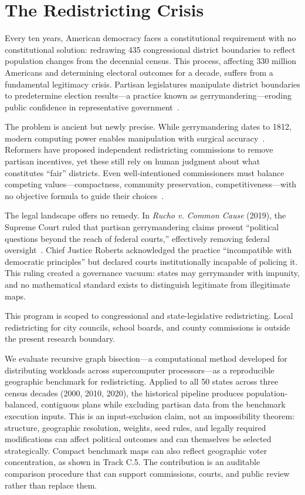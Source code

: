 \section{The Redistricting Crisis}

Every ten years, American democracy faces a constitutional requirement with no constitutional solution: redrawing 435 congressional district boundaries to reflect population changes from the decennial census. This process, affecting 330 million Americans and determining electoral outcomes for a decade, suffers from a fundamental legitimacy crisis. Partisan legislatures manipulate district boundaries to predetermine election results---a practice known as gerrymandering---eroding public confidence in representative government~\cite{stephanopoulos2015partisan}.

The problem is ancient but newly precise. While gerrymandering dates to 1812, modern computing power enables manipulation with surgical accuracy~\cite{cho2016measuring}. Reformers have proposed independent redistricting commissions to remove partisan incentives, yet these still rely on human judgment about what constitutes ``fair'' districts. Even well-intentioned commissioners must balance competing values---compactness, community preservation, competitiveness---with no objective formula to guide their choices~\cite{duchin2018geometry}.

The legal landscape offers no remedy. In \emph{Rucho v. Common Cause} (2019), the Supreme Court ruled that partisan gerrymandering claims present ``political questions beyond the reach of federal courts,'' effectively removing federal oversight~\cite{rucho2019}. Chief Justice Roberts acknowledged the practice ``incompatible with democratic principles'' but declared courts institutionally incapable of policing it. This ruling created a governance vacuum: states may gerrymander with impunity, and no mathematical standard exists to distinguish legitimate from illegitimate maps.

This program is scoped to congressional and state-legislative redistricting. Local redistricting for city councils, school boards, and county commissions is outside the present research boundary.

We evaluate recursive graph bisection---a computational method developed for distributing workloads across supercomputer processors---as a reproducible geographic benchmark for redistricting. Applied to all 50 states across three census decades (2000, 2010, 2020), the historical pipeline produces population-balanced, contiguous plans while excluding partisan data from the benchmark execution inputs. This is an input-exclusion claim, not an impossibility theorem: structure, geographic resolution, weights, seed rules, and legally required modifications can affect political outcomes and can themselves be selected strategically. Compact benchmark maps can also reflect geographic voter concentration, as shown in Track C.5. The contribution is an auditable comparison procedure that can support commissions, courts, and public review rather than replace them.
